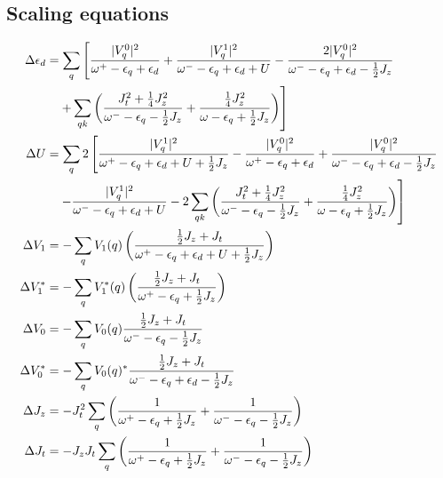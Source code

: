 \documentclass[14pt]{extarticle}
\numberwithin{equation}{section}
\begin{document}
\subsection{Scaling equations}
\begin{align*}
\Delta \epsilon_d &= \sum_q \left[\frac{|V_q^0|^2}{\omega^+ - \epsilon_q + \epsilon_d } + \frac{|V_q^1|^2}{\omega^- - \epsilon_q + \epsilon_d  + U} - \frac{2|V_q^0|^2}{\omega^- - \epsilon_q + \epsilon_d - \frac{1}{2} J_z} \right.\\
		  &\quad\left.+ \sum_{qk}\left({\frac{J_t^2 + \frac{1}{4}J_z^2}{\omega^- - \epsilon_q - \frac{1}{2} J_z} + \frac{\frac{1}{4}J_z^2}{\omega - \epsilon_q + \frac{1}{2} J_z}}\right)\right]\\
	\Delta U &= \sum_q 2\left[\frac{|V_q^1|^2}{\omega^+ - \epsilon_q + \epsilon_d + U + \frac{1}{2} J_z} - \frac{|V_q^0|^2}{\omega^+ - \epsilon_q + \epsilon_d} + \frac{|V_q^0|^2}{\omega^- - \epsilon_q + \epsilon_d  - \frac{1}{2} J_z}  \right.\\
		 &\quad\left.- \frac{|V_q^1|^2}{\omega^- - \epsilon_q + \epsilon_d + U} - 2\sum_{qk}\left({\frac{J_t^2 + \frac{1}{4}J_z^2}{\omega^- - \epsilon_q - \frac{1}{2} J_z} + \frac{\frac{1}{4}J_z^2}{\omega - \epsilon_q + \frac{1}{2} J_z}}\right)\right]\\
\Delta V_1 &= -\sum_q V_1(q)\left({\frac{\frac{1}{2} J_z + J_t}{\omega^+ - \epsilon_q +\epsilon_d + U + \frac{1}{2} J_z}}\right)\\
\Delta V_1^* &= -\sum_q V_1^*(q)\left({\frac{\frac{1}{2} J_z + J_t}{\omega^+ - \epsilon_q + \frac{1}{2} J_z}}\right)\\
\Delta V_0 &= -\sum_q V_0(q)\frac{\frac{1}{2} J_z + J_t}{\omega^- - \epsilon_q  - \frac{1}{2}  J_z}\\
\Delta V_0^* &= -\sum_q V_0(q)^*\frac{\frac{1}{2} J_z + J_t}{\omega^- - \epsilon_q + \epsilon_d - \frac{1}{2}  J_z}\\
\Delta J_z &= -J_t^2 \sum_q \left({\frac{1}{\omega^+ - \epsilon_q  + \frac{1}{2} J_z} + \frac{1}{\omega^- - \epsilon_q  - \frac{1}{2} J_z}}\right)\\
\Delta J_t &= - J_z J_t \sum_q \left({\frac{1}{\omega^+ - \epsilon_q  + \frac{1}{2} J_z} + \frac{1}{\omega^- - \epsilon_q  - \frac{1}{2} J_z}}\right)
\end{align*}
\end{document}
